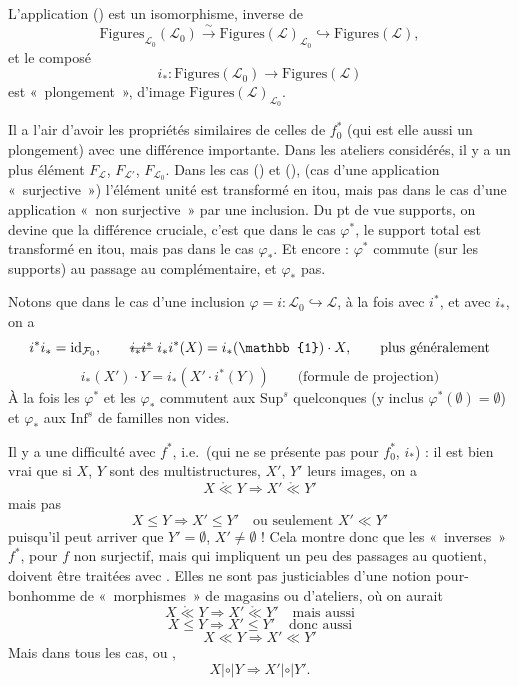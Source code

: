 \documentclass[11pt,a4paper]{article}
\begin{document}
L'application (\ill{}) est un isomorphisme, inverse de
\[
\mathrm{Figures}_{\mathcal{L}_0}(\mathcal{L}_0) \xrightarrow{\ \sim\ } \mathrm{Figures}(\mathcal{L})_{\mathcal{L}_0} \hookrightarrow \mathrm{Figures}(\mathcal{L}) ,
\]
et le composé
\[
i_* : \mathrm{Figures}(\mathcal{L}_0) \longrightarrow \mathrm{Figures}(\mathcal{L})
\]
est \struck{\ill{}} «~plongement~», d'image $\mathrm{Figures}(\mathcal{L})_{\mathcal{L}_0}$.

Il a l'air d'avoir les propriétés similaires de celles de $f_0^*$ (qui est elle
aussi un plongement) avec une différence importante. Dans les ateliers
considérés, il y a un plus  élément $F_{\mathcal{L}}$,
$F_{\mathcal{L}'}$, $F_{\mathcal{L}_0}$. Dans les cas
 (\ill{}) et (\ill{}),
\struck{\ill{}} (cas d'une application «~surjective~») l'élément unité est
transformé en itou, mais pas dans le cas d'une application «~non
surjective~» par une inclusion. Du pt de vue supports, on devine que la
différence cruciale, c'est que dans le cas $\varphi^*$, le support
\struck{\ill{}} total est transformé en itou, mais pas dans le cas
$\varphi_*$. Et encore : $\varphi^*$ commute (sur les supports) au passage
au complémentaire, et $\varphi_*$ pas.

Notons que dans le cas d'une inclusion $\varphi = i : \mathcal{L}_0 \hookrightarrow \mathcal{L}$,
  à la fois avec $i^*$, et avec $i_*$, on a
\[
i^* i_* = \mathrm{id}_{\mathcal{F}_0} , \qquad
\text{\struck{$i_* i^*$}}\ i_* i^*(X) = i_*(\mathbb{1}) \cdot X , \qquad \text{plus généralement}
\]
\[
i_*(X') \cdot Y = i_*(X' \cdot i^*(Y))
\qquad \text{(formule de projection)}
\]
À la fois les $\varphi^*$ et les $\varphi_*$ commutent aux $\mathrm{Sup}^s$
quelconques (y inclus $\varphi^*(\emptyset) = \emptyset$) et $\varphi_*$ aux
$\mathrm{Inf}^s$ de familles non vides.

Il y a une difficulté avec $f^*$, i.e.\ (qui ne se présente pas pour $f_0^*$,
$i_*$) : il est bien vrai que si $X$, $Y$ sont des multistructures, $X'$, $Y'$
leurs images, on a
\[
X \mathring{\ll} Y \Longrightarrow X' \mathring{\ll} Y'
\]
mais pas
\[
X \leq Y \Longrightarrow X' \leq Y' \quad \text{ou seulement } X' \ll Y'
\]
puisqu'il peut arriver que $Y' = \emptyset$, $X' \neq \emptyset$ ! Cela montre donc
que les   «~inverses~» $f^*$,
 pour $f$ non surjectif,
 mais qui impliquent un peu des
passages au quotient, doivent être traitées avec 
. Elles ne sont pas justiciables d'une notion
pour-bonhomme de «~morphismes~» de magasins ou d'ateliers, où on aurait
\[
X \mathring{\ll} Y \Longrightarrow X' \mathring{\ll} Y' \quad \text{mais aussi}
\]
\[
X \leq Y \Longrightarrow X' \leq Y' \quad \text{donc aussi}
\]
\[
X \ll Y \Longrightarrow X' \ll Y'
\]
Mais dans tous les cas,  ou , 
\[
X \mathbin{|{\circ}|} Y \Longrightarrow X' \mathbin{|{\circ}|} Y' .
\]
\end{document}

